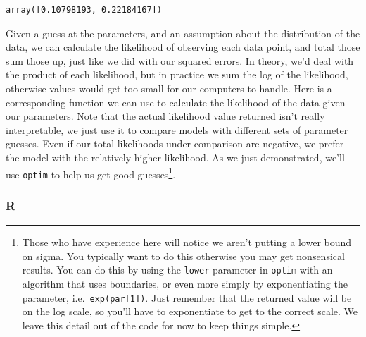 \documentclass[
  letterpaper,
]{krantz}
\begin{document}
\begin{verbatim}
array([0.10798193, 0.22184167])
\end{verbatim}

Given a guess at the parameters, and an assumption about the
distribution of the data, we can calculate the likelihood of observing
each data point, and total those sum those up, just like we did with our
squared errors. In theory, we'd deal with the product of each
likelihood, but in practice we sum the log of the likelihood, otherwise
values would get too small for our computers to handle. Here is a
corresponding function we can use to calculate the likelihood of the
data given our parameters. Note that the actual likelihood value
returned isn't really interpretable, we just use it to compare models
with different sets of parameter guesses. Even if our total likelihoods
under comparison are negative, we prefer the model with the relatively
higher likelihood. As we just demonstrated, we'll use \texttt{optim} to
help us get good guesses\footnote{Those who have experience here will
  notice we aren't putting a lower bound on sigma. You typically want to
  do this otherwise you may get nonsensical results. You can do this by
  using the \texttt{lower} parameter in \texttt{optim} with an algorithm
  that uses boundaries, or even more simply by exponentiating the
  parameter, i.e.~\texttt{exp(par{[}1{]})}. Just remember that the
  returned value will be on the log scale, so you'll have to
  exponentiate to get to the correct scale. We leave this detail out of
  the code for now to keep things simple.}.

\subsubsection{R}
\end{document}
